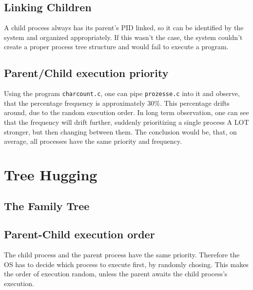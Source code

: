 \documentclass[a4paper, 11pt]{article}
\begin{document}
    \subsection{Linking Children}
    A child process always has its parent's PID linked, so it can be identified by the system and organized appropriately. 
    If this wasn't the case, the system couldn't create a proper process tree structure and would fail to execute a program. 

    \subsection{Parent/Child execution priority}
    Using the program \texttt{charcount.c}, one can pipe \texttt{prozesse.c} into it and observe, that the percentage frequency is approximately $30\%$.
    This percentage drifts around, due to the random execution order. In long term observation, one can see that the frequency will drift further, suddenly prioritizing
    a single process A LOT stronger, but then changing between them. The conclusion would be, that, on average, all processes have the same priority and frequency. 
    \newpage

    \section{Tree Hugging}
    
    \subsection{The Family Tree}

    \subsection{Parent-Child execution order}
    The child process and the parent process have the same priority. Therefore the OS has to decide which process to execute first, by randomly chosing.
    This makes the order of execution random, unless the parent awaits the child process's execution. 
\end{document}
